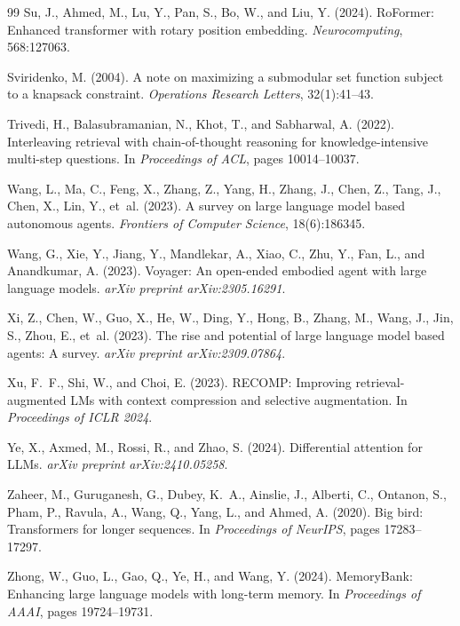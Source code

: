 \documentclass[review,12pt]{elsarticle}
\begin{document}
\begin{thebibliography}{99}
Su, J., Ahmed, M., Lu, Y., Pan, S., Bo, W., and Liu, Y. (2024).
\newblock RoFormer: Enhanced transformer with rotary position embedding.
\newblock \textit{Neurocomputing}, 568:127063.

Sviridenko, M. (2004).
\newblock A note on maximizing a submodular set function subject to a knapsack
  constraint.
\newblock \textit{Operations Research Letters}, 32(1):41--43.

Trivedi, H., Balasubramanian, N., Khot, T., and Sabharwal, A. (2022).
\newblock Interleaving retrieval with chain-of-thought reasoning for
  knowledge-intensive multi-step questions.
\newblock In \textit{Proceedings of ACL}, pages 10014--10037.

Wang, L., Ma, C., Feng, X., Zhang, Z., Yang, H., Zhang, J., Chen, Z.,
  Tang, J., Chen, X., Lin, Y., et~al. (2023).
\newblock A survey on large language model based autonomous agents.
\newblock \textit{Frontiers of Computer Science}, 18(6):186345.

Wang, G., Xie, Y., Jiang, Y., Mandlekar, A., Xiao, C., Zhu, Y., Fan, L., and
  Anandkumar, A. (2023).
\newblock Voyager: An open-ended embodied agent with large language models.
\newblock \textit{arXiv preprint arXiv:2305.16291}.

Xi, Z., Chen, W., Guo, X., He, W., Ding, Y., Hong, B., Zhang, M., Wang, J.,
  Jin, S., Zhou, E., et~al. (2023).
\newblock The rise and potential of large language model based agents: A survey.
\newblock \textit{arXiv preprint arXiv:2309.07864}.

Xu, F.~F., Shi, W., and Choi, E. (2023).
\newblock RECOMP: Improving retrieval-augmented LMs with context compression
  and selective augmentation.
\newblock In \textit{Proceedings of ICLR 2024}.

Ye, X., Axmed, M., Rossi, R., and Zhao, S. (2024).
\newblock Differential attention for LLMs.
\newblock \textit{arXiv preprint arXiv:2410.05258}.

Zaheer, M., Guruganesh, G., Dubey, K.~A., Ainslie, J., Alberti, C.,
  Ontanon, S., Pham, P., Ravula, A., Wang, Q., Yang, L., and Ahmed, A. (2020).
\newblock Big bird: Transformers for longer sequences.
\newblock In \textit{Proceedings of NeurIPS}, pages 17283--17297.

Zhong, W., Guo, L., Gao, Q., Ye, H., and Wang, Y. (2024).
\newblock MemoryBank: Enhancing large language models with long-term memory.
\newblock In \textit{Proceedings of AAAI}, pages 19724--19731.

\end{thebibliography}
\end{document}
